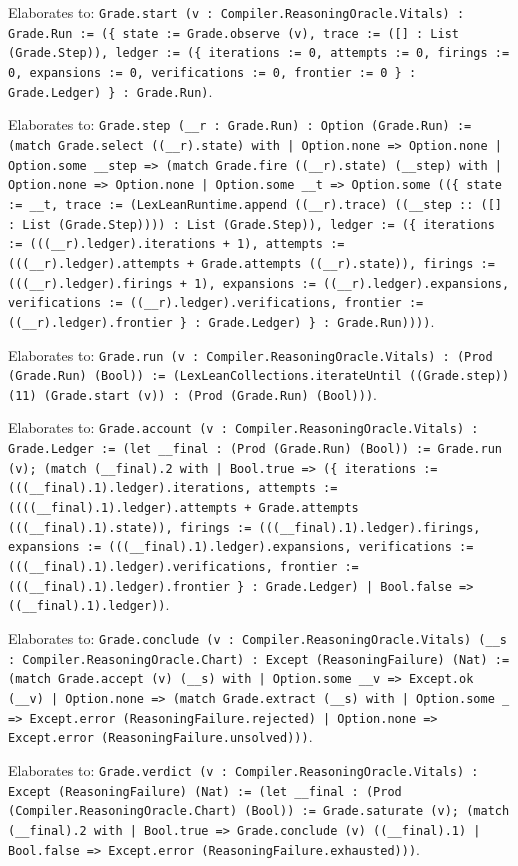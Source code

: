 \documentclass[11pt]{article}
\begin{document}
\noindent Elaborates to: \texttt{Grade.start (v : Compiler.ReasoningOracle.Vitals) : Grade.Run := (\{ state := Grade.observe (v), trace := ([] : List (Grade.Step)), ledger := (\{ iterations := 0, attempts := 0, firings := 0, expansions := 0, verifications := 0, frontier := 0 \} : Grade.Ledger) \} : Grade.Run)}.\par
\noindent Elaborates to: \texttt{Grade.step (\_\_r : Grade.Run) : Option (Grade.Run) := (match Grade.select ((\_\_r).state) with | Option.none => Option.none | Option.some \_\_step => (match Grade.fire ((\_\_r).state) (\_\_step) with | Option.none => Option.none | Option.some \_\_t => Option.some ((\{ state := \_\_t, trace := (LexLeanRuntime.append ((\_\_r).trace) ((\_\_step :: ([] : List (Grade.Step)))) : List (Grade.Step)), ledger := (\{ iterations := (((\_\_r).ledger).iterations + 1), attempts := (((\_\_r).ledger).attempts + Grade.attempts ((\_\_r).state)), firings := (((\_\_r).ledger).firings + 1), expansions := ((\_\_r).ledger).expansions, verifications := ((\_\_r).ledger).verifications, frontier := ((\_\_r).ledger).frontier \} : Grade.Ledger) \} : Grade.Run))))}.\par
\noindent Elaborates to: \texttt{Grade.run (v : Compiler.ReasoningOracle.Vitals) : (Prod (Grade.Run) (Bool)) := (LexLeanCollections.iterateUntil ((Grade.step)) (11) (Grade.start (v)) : (Prod (Grade.Run) (Bool)))}.\par
\noindent Elaborates to: \texttt{Grade.account (v : Compiler.ReasoningOracle.Vitals) : Grade.Ledger := (let \_\_final : (Prod (Grade.Run) (Bool)) := Grade.run (v); (match (\_\_final).2 with | Bool.true => (\{ iterations := (((\_\_final).1).ledger).iterations, attempts := ((((\_\_final).1).ledger).attempts + Grade.attempts (((\_\_final).1).state)), firings := (((\_\_final).1).ledger).firings, expansions := (((\_\_final).1).ledger).expansions, verifications := (((\_\_final).1).ledger).verifications, frontier := (((\_\_final).1).ledger).frontier \} : Grade.Ledger) | Bool.false => ((\_\_final).1).ledger))}.\par
\noindent Elaborates to: \texttt{Grade.conclude (v : Compiler.ReasoningOracle.Vitals) (\_\_s : Compiler.ReasoningOracle.Chart) : Except (ReasoningFailure) (Nat) := (match Grade.accept (v) (\_\_s) with | Option.some \_\_v => Except.ok (\_\_v) | Option.none => (match Grade.extract (\_\_s) with | Option.some \_ => Except.error (ReasoningFailure.rejected) | Option.none => Except.error (ReasoningFailure.unsolved)))}.\par
\noindent Elaborates to: \texttt{Grade.verdict (v : Compiler.ReasoningOracle.Vitals) : Except (ReasoningFailure) (Nat) := (let \_\_final : (Prod (Compiler.ReasoningOracle.Chart) (Bool)) := Grade.saturate (v); (match (\_\_final).2 with | Bool.true => Grade.conclude (v) ((\_\_final).1) | Bool.false => Except.error (ReasoningFailure.exhausted)))}.\par
\end{document}
